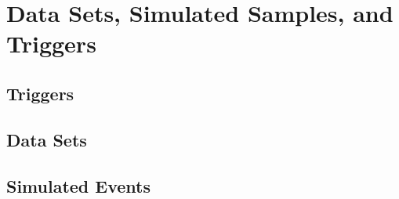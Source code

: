 \section{Data Sets, Simulated Samples, and Triggers}
\label{sec:datasets_simul_trig}

\subsection{Triggers}
\label{sec:trig}


\subsection{Data Sets}


\subsection{Simulated Events}
\label{sec:sim_samples}
